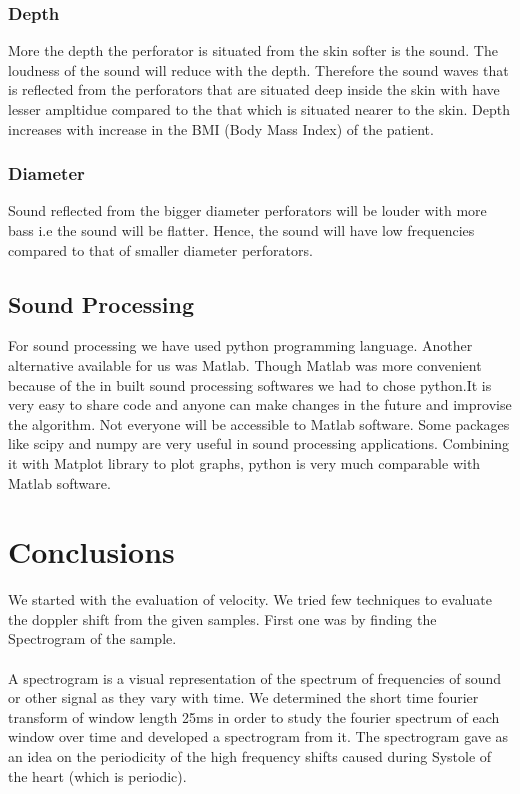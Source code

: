 \documentclass[BTech]{nitkdiss}
\begin{document}
\subsection{Depth}

\hspace{0.4cm} More the depth the perforator is situated from the skin softer is the sound. The loudness of the sound will reduce with the depth. Therefore the sound waves that is reflected from the perforators that are situated deep inside the skin with have lesser ampltidue compared to the that which is situated nearer to the skin. Depth increases with increase in the BMI (Body Mass Index) of the patient.


\subsection{Diameter}

\hspace{0.4cm} Sound reflected from the bigger diameter perforators will be louder with more bass i.e the sound will be flatter. Hence, the sound will have low frequencies compared to that of smaller diameter perforators.

\section{Sound Processing}

\hspace{0.4cm} For sound processing we have used python programming language. Another alternative available for us was Matlab. Though Matlab was more convenient because of the in built sound processing softwares we had to chose python.It is very easy to share code and anyone can make changes in the future and improvise the algorithm. Not everyone will be accessible to Matlab software. Some packages like scipy and numpy are very useful in sound processing applications. Combining it with Matplot library to plot graphs, python is very much comparable with Matlab software.

\chapter{Conclusions}

\hspace{0.4cm} We started with the evaluation of velocity. We tried few techniques to evaluate the doppler shift from the given samples. First one was by finding the Spectrogram of the sample.\\
\\
\hspace{0.4cm} A spectrogram is a visual representation of the spectrum of frequencies of sound or other signal as they vary with time. We determined the short time fourier transform of window length 25ms in order to study the fourier spectrum of each window over time and developed a spectrogram from it. The spectrogram gave as an idea on the periodicity of the high frequency shifts caused during Systole of the heart (which is periodic). 
\end{document}
